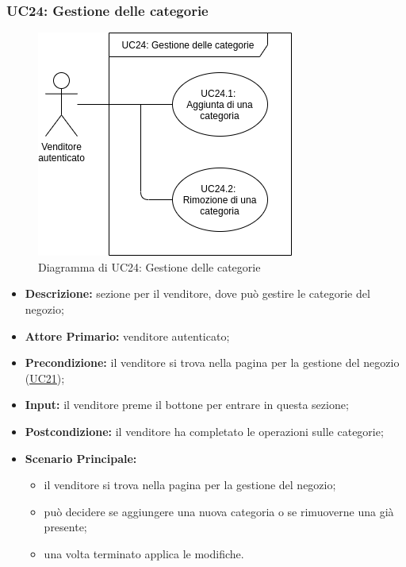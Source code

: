         \subsubsection{UC24: Gestione delle categorie}
        \label{sec:UC24}
        \begin{figure}[!ht]
            \caption{Diagramma di UC24: Gestione delle categorie}
            \vspace{10px}
            \includegraphics[scale=0.5]{../../../Images/AnalisiRequisiti/UC24}
            \centering
        \end{figure}
        \begin{itemize}
            \item \textbf{Descrizione:} sezione per il venditore, dove può gestire le categorie del negozio;
            \item \textbf{Attore Primario:} venditore autenticato;
            \item \textbf{Precondizione:} il venditore si trova nella pagina per la gestione del negozio (\hyperref[sec:UC21]{\underline{UC21}});
            \item \textbf{Input:} il venditore preme il bottone per entrare in questa sezione;
            \item \textbf{Postcondizione:} il venditore ha completato le operazioni sulle categorie;
            \item \textbf{Scenario Principale:} 
                \begin{itemize}
                    \item il venditore si trova nella pagina per la gestione del negozio;
                    \item può decidere se aggiungere una nuova categoria o se rimuoverne una già presente;
                    \item una volta terminato applica le modifiche.
                \end{itemize}
        \end{itemize}

